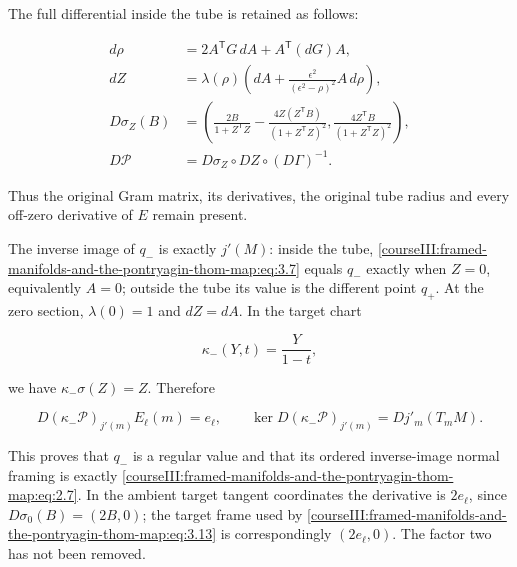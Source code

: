 The full differential inside the tube is retained as follows:

\begin{equation}
\begin{aligned}
 d\rho&=2A^{\mathsf T}G\,dA+A^{\mathsf T}(dG)A,\\
 dZ&=\lambda(\rho)\left(dA+
               \frac{\epsilon^2}{(\epsilon^2-\rho)^2}A\,d\rho\right),\\
 D\sigma_Z(B)&=
 \left(\frac{2B}{1+Z^{\mathsf T}Z}
      -\frac{4Z(Z^{\mathsf T}B)}{(1+Z^{\mathsf T}Z)^2},
       \frac{4Z^{\mathsf T}B}{(1+Z^{\mathsf T}Z)^2}\right),\\
 D\mathcal P&=D\sigma_Z\circ DZ\circ(D\Gamma)^{-1}.
\end{aligned}
\label{courseIII:framed-manifolds-and-the-pontryagin-thom-map:eq:3.12}
\end{equation}

Thus the original Gram matrix, its derivatives, the original tube radius and every off-zero derivative of \(E\) remain present.

The inverse image of \(q_-\) is exactly \(j'(M)\): inside the tube, \eqref{courseIII:framed-manifolds-and-the-pontryagin-thom-map:eq:3.7} equals \(q_-\) exactly when \(Z=0\), equivalently \(A=0\); outside the tube its value is the different point \(q_+\). At the zero section, \(\lambda(0)=1\) and \(dZ=dA\). In the target chart

\begin{equation}
\kappa_-(Y,t)=\frac{Y}{1-t},
 \label{courseIII:framed-manifolds-and-the-pontryagin-thom-map:eq:3.13}
\end{equation}

we have \(\kappa_-\sigma(Z)=Z\). Therefore

\begin{equation}
D(\kappa_-\mathcal P)_{j'(m)}E_\ell(m)=e_\ell,\qquad
 \ker D(\kappa_-\mathcal P)_{j'(m)}=Dj'_m(T_mM).
 \label{courseIII:framed-manifolds-and-the-pontryagin-thom-map:eq:3.14}
\end{equation}

This proves that \(q_-\) is a regular value and that its ordered inverse-image normal framing is exactly \eqref{courseIII:framed-manifolds-and-the-pontryagin-thom-map:eq:2.7}. In the ambient target tangent coordinates the derivative is \(2e_\ell\), since \(D\sigma_0(B)=(2B,0)\); the target frame used by \eqref{courseIII:framed-manifolds-and-the-pontryagin-thom-map:eq:3.13} is correspondingly \((2e_\ell,0)\). The factor two has not been removed.

